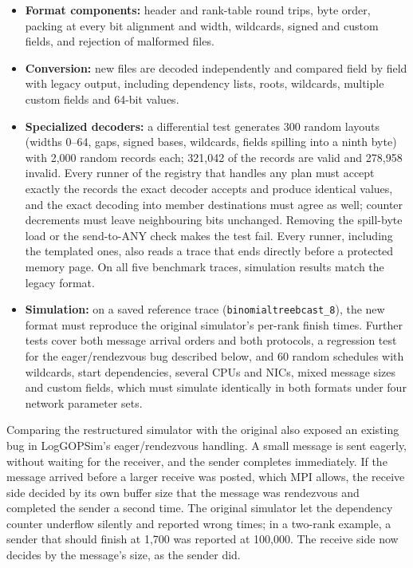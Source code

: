 \documentclass[10pt,a4paper]{article}
\begin{document}
\begin{itemize}
\item \textbf{Format components:} header and rank-table round trips, byte order, packing at every bit alignment and width, wildcards, signed and custom fields, and rejection of malformed files.
\item \textbf{Conversion:} new files are decoded independently and compared field by field with legacy output, including dependency lists, roots, wildcards, multiple custom fields and 64-bit values.
\item \textbf{Specialized decoders:} a differential test generates 300 random layouts (widths 0--64, gaps, signed bases, wildcards, fields spilling into a ninth byte) with 2,000 random records each; 321,042 of the records are valid and 278,958 invalid. Every runner of the registry that handles any plan must accept exactly the records the exact decoder accepts and produce identical values, and the exact decoding into member destinations must agree as well; counter decrements must leave neighbouring bits unchanged. Removing the spill-byte load or the send-to-ANY check makes the test fail. Every runner, including the templated ones, also reads a trace that ends directly before a protected memory page. On all five benchmark traces, simulation results match the legacy format.
\item \textbf{Simulation:} on a saved reference trace (\texttt{binomialtree\allowbreak{}bcast\_\allowbreak{}8}), the new format must reproduce the original simulator's per-rank finish times. Further tests cover both message arrival orders and both protocols, a regression test for the eager/rendezvous bug described below, and 60 random schedules with wildcards, start dependencies, several CPUs and NICs, mixed message sizes and custom fields, which must simulate identically in both formats under four network parameter sets.
\end{itemize}

Comparing the restructured simulator with the original also exposed an existing bug in LogGOPSim's eager/rendezvous handling. A small message is sent eagerly, without waiting for the receiver, and the sender completes immediately. If the message arrived before a larger receive was posted, which MPI allows, the receive side decided by its own buffer size that the message was rendezvous and completed the sender a second time. The original simulator let the dependency counter underflow silently and reported wrong times; in a two-rank example, a sender that should finish at 1,700 was reported at 100,000. The receive side now decides by the message's size, as the sender did.
\end{document}
